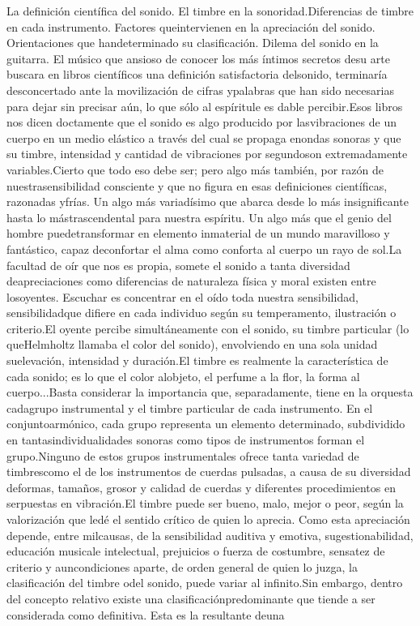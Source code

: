 \documentclass[
10pt, %
a4paper, %
oneside, %
headinclude,footinclude, %
BCOR5mm, %
]{scrartcl}
\begin{document}

\par{La definición científica del sonido. El timbre en la sonoridad.Diferencias de timbre en cada instrumento. Factores queintervienen en la apreciación del sonido. Orientaciones que handeterminado su clasificación. Dilema del sonido en la guitarra.
El músico que ansioso de conocer los más íntimos secretos desu arte buscara en libros científicos una definición satisfactoria delsonido, terminaría desconcertado ante la movilización de cifras ypalabras que han sido necesarias para dejar sin precisar aún, lo que sólo al espíritule es dable percibir.Esos libros nos dicen doctamente que el sonido es algo producido por lasvibraciones de un cuerpo en un medio elástico a través del cual se propaga enondas sonoras y que su timbre, intensidad y cantidad de vibraciones por segundoson extremadamente variables.Cierto que todo eso debe ser; pero algo más también, por razón de nuestrasensibilidad consciente y que no figura en esas definiciones científicas, razonadas yfrías. Un algo más variadísimo que abarca desde lo más insignificante hasta lo mástrascendental para nuestra espíritu. Un algo más que el genio del hombre puedetransformar en elemento inmaterial de un mundo maravilloso y fantástico, capaz deconfortar el alma como conforta al cuerpo un rayo de sol.La facultad de oír que nos es propia, somete el sonido a tanta diversidad deapreciaciones como diferencias de naturaleza física y moral existen entre losoyentes. Escuchar es concentrar en el oído toda nuestra sensibilidad, sensibilidadque difiere en cada individuo según su temperamento, ilustración o criterio.El oyente percibe simultáneamente con el sonido, su timbre particular (lo queHelmholtz llamaba el color del sonido), envolviendo en una sola unidad suelevación, intensidad y duración.El timbre es realmente la característica de cada sonido; es lo que el color alobjeto, el perfume a la flor, la forma al cuerpo...Basta considerar la importancia que, separadamente, tiene en la orquesta cadagrupo instrumental y el timbre particular de cada instrumento. En el conjuntoarmónico, cada grupo representa un elemento determinado, subdividido en tantasindividualidades sonoras como tipos de instrumentos forman el grupo.Ninguno de estos grupos instrumentales ofrece tanta variedad de timbrescomo el de los instrumentos de cuerdas pulsadas, a causa de su diversidad deformas, tamaños, grosor y calidad de cuerdas y diferentes procedimientos en serpuestas en vibración.El timbre puede ser bueno, malo, mejor o peor, según la valorización que ledé el sentido crítico de quien lo aprecia. Como esta apreciación depende, entre milcausas, de la sensibilidad auditiva y emotiva, sugestionabilidad, educación musicale intelectual, prejuicios o fuerza de costumbre, sensatez de criterio y auncondiciones aparte, de orden general de quien lo juzga, la clasificación del timbre odel sonido, puede variar al infinito.Sin embargo, dentro del concepto relativo existe una clasificaciónpredominante que tiende a ser considerada como definitiva. Esta es la resultante deuna }
\end{document}
